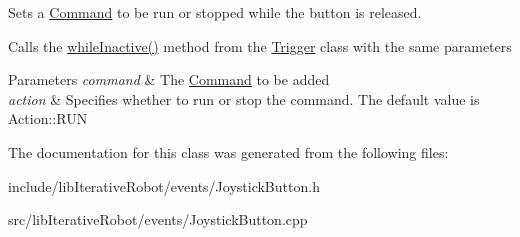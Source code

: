 Sets a \mbox{\hyperlink{classlib_iterative_robot_1_1_command}{Command}} to be run or stopped while the button is released. 

Calls the \mbox{\hyperlink{classlib_iterative_robot_1_1_trigger_a7de90fbdaa1d6450f6f1bc532af85686}{while\+Inactive()}} method from the \mbox{\hyperlink{classlib_iterative_robot_1_1_trigger}{Trigger}} class with the same parameters


\begin{DoxyParams}{Parameters}
{\em command} & The \mbox{\hyperlink{classlib_iterative_robot_1_1_command}{Command}} to be added \\
\hline
{\em action} & Specifies whether to run or stop the command. The default value is Action\+::\+R\+UN \\
\hline
\end{DoxyParams}


The documentation for this class was generated from the following files\+:\begin{DoxyCompactItemize}
\item 
include/lib\+Iterative\+Robot/events/Joystick\+Button.\+h\item 
src/lib\+Iterative\+Robot/events/Joystick\+Button.\+cpp\end{DoxyCompactItemize}
